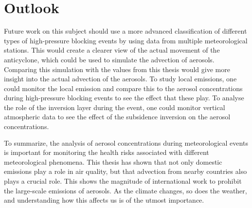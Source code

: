 \section{Outlook}
Future work on this subject should use a more advanced classification of different types of high-pressure blocking events by using data from multiple meteorological stations. This would create a clearer view of the actual movement of the anticyclone, which could be used to simulate the advection of aerosols. Comparing this simulation with the values from this thesis would give more insight into the actual advection of the aerosols. To study local emissions, one could monitor the local emission and compare this to the aerosol concentrations during high-pressure blocking events to see the effect that these play. To analyse the role of the inversion layer during the event, one could monitor vertical atmospheric data to see the effect of the subsidence inversion on the aerosol concentrations.

To summarize, the analysis of aerosol concentrations during meteorological events is important for monitoring the health risks associated with different meteorological phenomena. This thesis has shown that not only domestic emissions play a role in air quality, but that advection from nearby countries also plays a crucial role. This shows the magnitude of international work to prohibit the large-scale emissions of aerosols. As the climate changes, so does the weather, and understanding how this affects us is of the utmost importance.

